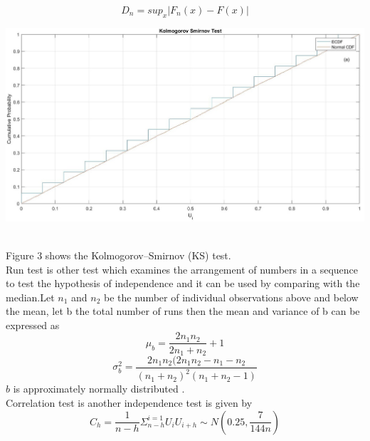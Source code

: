 \begin{equation}
    D_n=sup_{x}{|F_{n}(x)-F(x)|}
\end{equation}
 \begin{center}
    \includegraphics[scale=0.3]{Figures/figure1_3.jpg}\\
\end{center}\\
Figure 3 shows the Kolmogorov–Smirnov (KS) test.\\
Run test is other test which examines the arrangement of numbers in a sequence to test the hypothesis of independence and it can be used by comparing with the median.Let $n_1$ and $n_2$ be the number of individual observations above and below the mean, let b the total number of runs then the mean and variance of b can be expressed as 
\begin{equation}
    \mu_{b}=\frac{2n_{1}n_{2}}{2n_{1}+n_{2}}+1
\end{equation}
\begin{equation}
    \sigma^2_{b}=\frac{2n_{1}n_{2}(2n_{1}n_{2}-n_{1}-n_{2}}{(n_{1}+n_{2})^2(n_{1}+n_{2}-1)}
\end{equation}
$b$ is approximately normally distributed .\\
Correlation test is another independence test is given by
\begin{equation}
    C_{h}=\frac{1}{n-h}\Sigma^{i=1}_{n-h}U_{i}U_{i+h}\sim N(0.25,\frac{7}{144n})
\end{equation}





